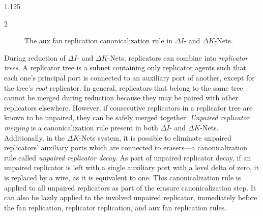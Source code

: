 \documentclass[10pt]{article}
\begin{document}
\begin{spacing}{1.125}
\begin{multicols}{2}
\begin{figure}[!t]
  \caption{The aux fan replication canonicalization rule in \mbox{$\Delta I$-} and \mbox{$\Delta K$}-Nets.}
  \label{fig:ipsi}
\end{figure}

During reduction of \mbox{$\Delta I$-} and \mbox{$\Delta K$-Nets}, replicators can combine into \textit{replicator trees}. A replicator tree is a subnet containing only replicator agents such that each one's principal port is connected to an auxiliary port of another, except for the tree's \textit{root} replicator.
In general, replicators that  belong to the same tree cannot be merged during reduction because they may be paired with other replicators elsewhere. However, if consecutive replicators in a replicator tree are known to be unpaired, they can be safely merged together.
\emph{Unpaired replicator merging} is a canonicalization rule present in both \mbox{$\Delta I$-} and \mbox{$\Delta K$-Nets}.
Additionally, in the \mbox{$\Delta K$-Nets} system, it is possible to eliminate unpaired replicators' auxiliary ports which are connected to erasers---a canonicalization rule called \emph{unpaired replicator decay}.
As part of unpaired replicator decay, if an unpaired replicator is left with a single auxiliary port with a level delta of zero, it is replaced by a wire, as it is equivalent to one.
This canonicalization rule is applied to all unpaired replicators as part of the erasure canonicalization step. It can also be lazily applied to the involved unpaired replicator, immediately before the fan replication, replicator replication, and aux fan replication rules.


\end{multicols}
\end{spacing}
\end{document}
